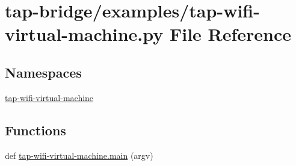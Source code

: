 \hypertarget{tap-wifi-virtual-machine_8py}{}\section{tap-\/bridge/examples/tap-\/wifi-\/virtual-\/machine.py File Reference}
\label{tap-wifi-virtual-machine_8py}
\subsection*{Namespaces}
\begin{DoxyCompactItemize}
\item 
 \hyperlink{namespacetap-wifi-virtual-machine}{tap-\/wifi-\/virtual-\/machine}
\end{DoxyCompactItemize}
\subsection*{Functions}
\begin{DoxyCompactItemize}
\item 
def \hyperlink{namespacetap-wifi-virtual-machine_ab59779626af8925d05c112e49231cab9}{tap-\/wifi-\/virtual-\/machine.\+main} (argv)
\end{DoxyCompactItemize}
